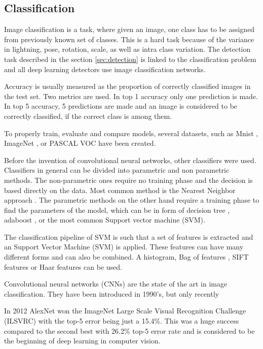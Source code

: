 \documentclass[a4paper,12pt,titlepage]{article}
\numberwithin{figure}{section}
\begin{document}
\subsection{Classification}

Image classification is a task, where given an image, one class has to be assigned from previously known set of classes. This is a hard task because of the variance in lightning, pose, rotation, scale, as well as intra class variation. The detection task described in the section \ref{sec:detection} is linked to the classification problem and all deep learning detectors use image classification networks.

Accuracy is usually measured as the proportion of correctly classified images in the test set. Two metrics are used. In top 1 accuracy only one prediction is made. In top 5 accuracy, 5 predictions are made and an image is considered to be correctly classified, if the correct class is among them.

To properly train, evaluate and compare models, several datasets, such as Mnist \cite{lecun-mnisthandwrittendigit-2010}, ImageNet \cite{deng2009imagenet}, or PASCAL VOC \cite{Everingham10} have been created.

Before the invention of convolutional neural networks, other classifiers were used. Classifiers in general can be divided into parametric and non parametric methods. The non-parametric ones require no training phase and the decision is based directly on the data. Most common method is the Nearest Neighbor approach \cite{boiman2008defense, zhang2006svm}. The parametric methods on the other hand require a training phase to find the parameters of the model, which can be in form of decision tree \cite{bosch2007image}, adaboost \cite{opelt2004weak}, or the most common Support vector machine (SVM).

The classification pipeline of SVM is such that a set of features is extracted and an Support Vector Machine (SVM) is applied. These features can have many different forms and can also be combined. A histogram\cite{chapelle1999support}, Bag of features \cite{lazebnik2006beyond, nowak2006sampling}, SIFT features \cite{yang2009linear, bicego2006use} or Haar features \cite{munder2006experimental} can be used.

Convolutional neural networks (CNNs) are the state of the art in image classification. They have been introduced in 1990's\cite{lecun1989backpropagation}, but only recently 

In 2012 AlexNet \cite{krizhevsky2012imagenet} won the ImageNet Large Scale Visual Recognition Challenge (ILSVRC) with the top-5 error being just a 15.4\%. This was a huge success compared to the second best with 26.2\% top-5 error rate and is considered to be the beginning of deep learning in computer vision. 
\end{document}
